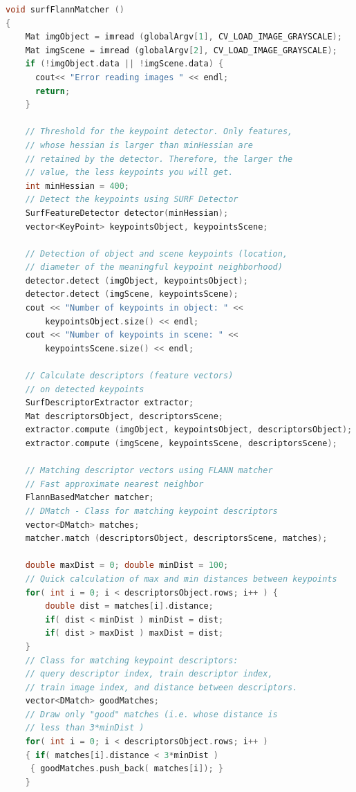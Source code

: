 \begin{lstlisting}[language=C,caption={Detekcija objekta na drugoj
    slici}]
void surfFlannMatcher ()
{
    Mat imgObject = imread (globalArgv[1], CV_LOAD_IMAGE_GRAYSCALE);
    Mat imgScene = imread (globalArgv[2], CV_LOAD_IMAGE_GRAYSCALE);
    if (!imgObject.data || !imgScene.data) { 
      cout<< "Error reading images " << endl; 
      return; 
    }

    // Threshold for the keypoint detector. Only features, 
    // whose hessian is larger than minHessian are 
    // retained by the detector. Therefore, the larger the
    // value, the less keypoints you will get.
    int minHessian = 400;
    // Detect the keypoints using SURF Detector
    SurfFeatureDetector detector(minHessian);
    vector<KeyPoint> keypointsObject, keypointsScene;

    // Detection of object and scene keypoints (location, 
    // diameter of the meaningful keypoint neighborhood)
    detector.detect (imgObject, keypointsObject);
    detector.detect (imgScene, keypointsScene);
    cout << "Number of keypoints in object: " << 
        keypointsObject.size() << endl;
    cout << "Number of keypoints in scene: " << 
        keypointsScene.size() << endl;

    // Calculate descriptors (feature vectors)
    // on detected keypoints
    SurfDescriptorExtractor extractor;
    Mat descriptorsObject, descriptorsScene;
    extractor.compute (imgObject, keypointsObject, descriptorsObject);
    extractor.compute (imgScene, keypointsScene, descriptorsScene);

    // Matching descriptor vectors using FLANN matcher
    // Fast approximate nearest neighbor
    FlannBasedMatcher matcher;
    // DMatch - Class for matching keypoint descriptors
    vector<DMatch> matches;
    matcher.match (descriptorsObject, descriptorsScene, matches);

    double maxDist = 0; double minDist = 100;
    // Quick calculation of max and min distances between keypoints
    for( int i = 0; i < descriptorsObject.rows; i++ ) { 
        double dist = matches[i].distance;
        if( dist < minDist ) minDist = dist;
        if( dist > maxDist ) maxDist = dist;
    }
    // Class for matching keypoint descriptors: 
    // query descriptor index, train descriptor index, 
    // train image index, and distance between descriptors.
    vector<DMatch> goodMatches;
    // Draw only "good" matches (i.e. whose distance is 
    // less than 3*minDist )
    for( int i = 0; i < descriptorsObject.rows; i++ )
    { if( matches[i].distance < 3*minDist )
     { goodMatches.push_back( matches[i]); }
    }


\end{lstlisting}
